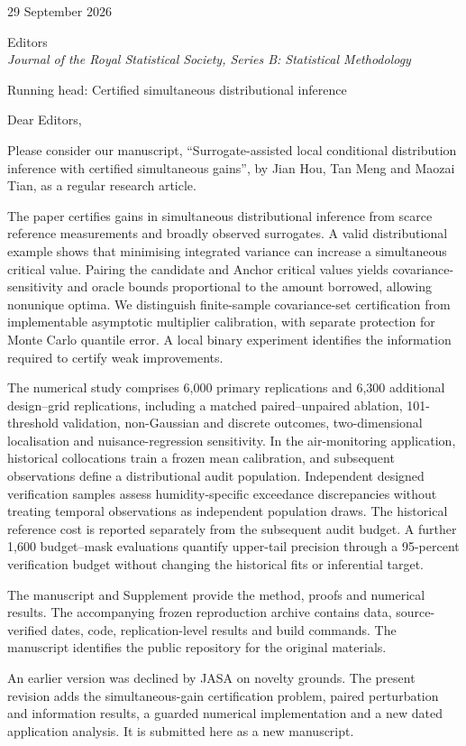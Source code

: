 \documentclass[11pt,a4paper]{article}
\begin{document}
29 September 2026

Editors\\
\textit{Journal of the Royal Statistical Society, Series B: Statistical Methodology}

Running head: Certified simultaneous distributional inference

Dear Editors,

Please consider our manuscript, ``Surrogate-assisted local conditional distribution inference with certified simultaneous gains'', by Jian Hou, Tan Meng and Maozai Tian, as a regular research article.

The paper certifies gains in simultaneous distributional inference from scarce reference measurements and broadly observed surrogates. A valid distributional example shows that minimising integrated variance can increase a simultaneous critical value. Pairing the candidate and Anchor critical values yields covariance-sensitivity and oracle bounds proportional to the amount borrowed, allowing nonunique optima. We distinguish finite-sample covariance-set certification from implementable asymptotic multiplier calibration, with separate protection for Monte Carlo quantile error. A local binary experiment identifies the information required to certify weak improvements.

The numerical study comprises 6,000 primary replications and 6,300 additional design--grid replications, including a matched paired--unpaired ablation, 101-threshold validation, non-Gaussian and discrete outcomes, two-dimensional localisation and nuisance-regression sensitivity. In the air-monitoring application, historical collocations train a frozen mean calibration, and subsequent observations define a distributional audit population. Independent designed verification samples assess humidity-specific exceedance discrepancies without treating temporal observations as independent population draws. The historical reference cost is reported separately from the subsequent audit budget. A further 1,600 budget--mask evaluations quantify upper-tail precision through a 95-percent verification budget without changing the historical fits or inferential target.

The manuscript and Supplement provide the method, proofs and numerical results. The accompanying frozen reproduction archive contains data, source-verified dates, code, replication-level results and build commands. The manuscript identifies the public repository for the original materials.

An earlier version was declined by JASA on novelty grounds. The present revision adds the simultaneous-gain certification problem, paired perturbation and information results, a guarded numerical implementation and a new dated application analysis. It is submitted here as a new manuscript.
\end{document}
